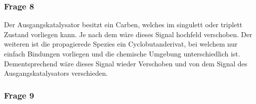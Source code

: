 \documentclass[10pt,a4paper,ngerman]{scrartcl}
\begin{document}
		\subsubsection{Frage 8}

			Der Ausgangskatalysator besitzt ein Carben, welches im singulett oder triplett Zustand vorliegen kann. Je nach dem wäre dieses Signal hochfeld verschoben. Der 
			weiteren ist die propagierede Spezies ein Cyclobutanderivat, bei welchem nur einfach Bindungen vorliegen und die chemische Umgebung unterschiedlich ist. 
			Dementsprechend wäre dieses Signal wieder Verschoben und von dem Signal des Ausgangskatalysators verschieden.

		\subsubsection{Frage 9}



\printbibliography
\end{document}
